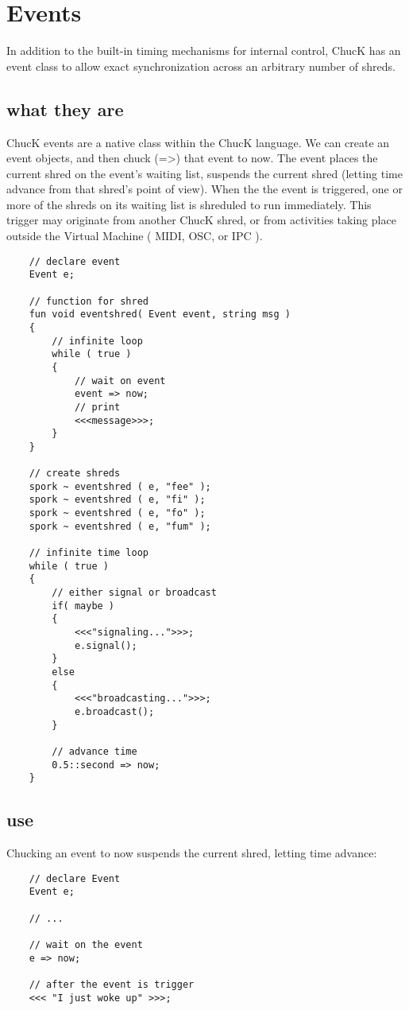 \chapter{Events}


In addition to the built-in timing mechanisms for internal control, ChucK has an event class to allow exact synchronization across an arbitrary number of shreds.

\section{what they are}

ChucK events are a native class within the ChucK language. We can create an event objects, and then chuck (=>) that event to now. The event places the current shred on the event's waiting list, suspends the current shred (letting time advance from that shred's point of view). When the the event is triggered, one or more of the shreds on its waiting list is shreduled to run immediately. This trigger may originate from another ChucK shred, or from activities taking place outside the Virtual Machine ( MIDI, OSC, or IPC ).
\begin{verbatim}
    // declare event
    Event e;

    // function for shred
    fun void eventshred( Event event, string msg )
    {
        // infinite loop
        while ( true )
        {
            // wait on event
            event => now;
            // print
            <<<message>>>;
        }
    }

    // create shreds
    spork ~ eventshred ( e, "fee" );
    spork ~ eventshred ( e, "fi" );
    spork ~ eventshred ( e, "fo" );
    spork ~ eventshred ( e, "fum" );

    // infinite time loop
    while ( true )
    {
        // either signal or broadcast
        if( maybe )
        { 
            <<<"signaling...">>>;
            e.signal();
        }
        else
        { 
            <<<"broadcasting...">>>;
            e.broadcast();
        }

        // advance time
        0.5::second => now;
    }
\end{verbatim}
 

\section{use}

Chucking an event to now suspends the current shred, letting time advance:
\begin{verbatim}
    // declare Event
    Event e;

    // ...

    // wait on the event
    e => now;

    // after the event is trigger
    <<< "I just woke up" >>>;
\end{verbatim}

